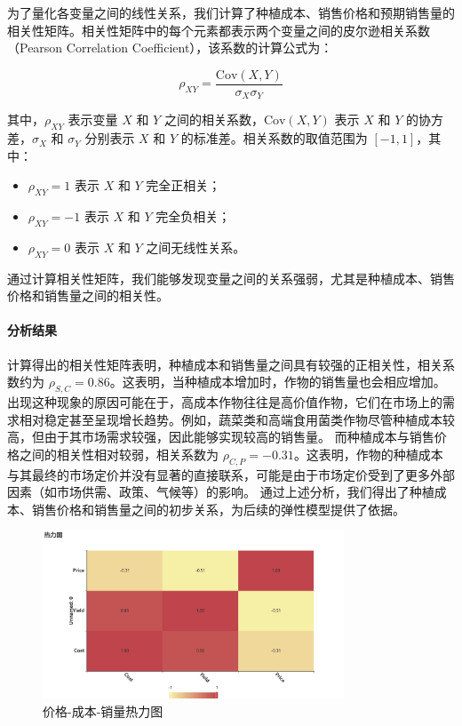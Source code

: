 \documentclass[12pt,a4paper]{nmmcm}
\begin{document}
为了量化各变量之间的线性关系，我们计算了种植成本、销售价格和预期销售量的相关性矩阵。相关性矩阵中的每个元素都表示两个变量之间的皮尔逊相关系数（Pearson Correlation Coefficient），该系数的计算公式为：

\[
\rho_{XY} = \frac{\mathrm{Cov}(X, Y)}{\sigma_X \sigma_Y}
\]

其中，$\rho_{XY}$ 表示变量 $X$ 和 $Y$ 之间的相关系数，$\mathrm{Cov}(X, Y)$ 表示 $X$ 和 $Y$ 的协方差，$\sigma_X$ 和 $\sigma_Y$ 分别表示 $X$ 和 $Y$ 的标准差。相关系数的取值范围为 $[-1, 1]$，其中：
\begin{itemize}
    \item $\rho_{XY} = 1$ 表示 $X$ 和 $Y$ 完全正相关；
    \item $\rho_{XY} = -1$ 表示 $X$ 和 $Y$ 完全负相关；
    \item $\rho_{XY} = 0$ 表示 $X$ 和 $Y$ 之间无线性关系。
\end{itemize}

通过计算相关性矩阵，我们能够发现变量之间的关系强弱，尤其是种植成本、销售价格和销售量之间的相关性。

\paragraph{分析结果}

计算得出的相关性矩阵表明，种植成本和销售量之间具有较强的正相关性，相关系数约为 $\rho_{S,C} = 0.86$。这表明，当种植成本增加时，作物的销售量也会相应增加。出现这种现象的原因可能在于，高成本作物往往是高价值作物，它们在市场上的需求相对稳定甚至呈现增长趋势。例如，蔬菜类和高端食用菌类作物尽管种植成本较高，但由于其市场需求较强，因此能够实现较高的销售量。
而种植成本与销售价格之间的相关性相对较弱，相关系数为 $\rho_{C,P} = -0.31$。这表明，作物的种植成本与其最终的市场定价并没有显著的直接联系，可能是由于市场定价受到了更多外部因素（如市场供需、政策、气候等）的影响。
通过上述分析，我们得出了种植成本、销售价格和销售量之间的初步关系，为后续的弹性模型提供了依据。

\begin{figure}[H]
  \centering
  \includegraphics[width=0.8\textwidth]{figures/prob3/correlation/价格_成本_销量热力图.png}
  \caption{价格-成本-销量热力图}
  \label{fig:heatmap}
\end{figure}
\end{document}
